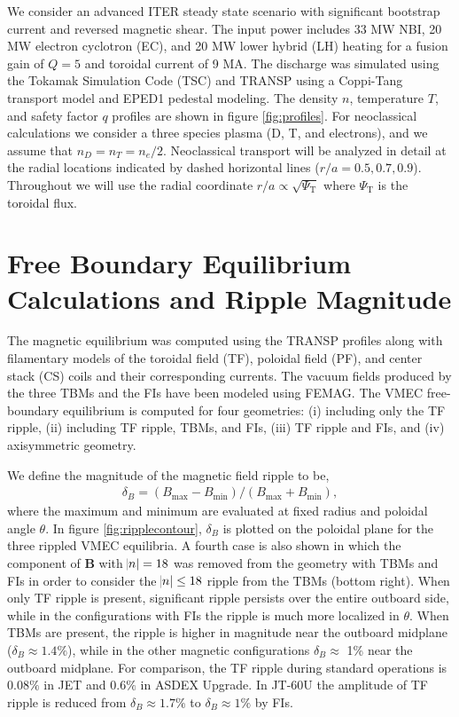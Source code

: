\documentclass[aip, pop, preprint]{revtex4-1}
\numberwithin{figure}{section}
\numberwithin{equation}{section}
\begin{document}
We consider an advanced ITER steady state scenario with significant bootstrap current and reversed magnetic shear.\cite{Poli2014} The input power includes 33 MW NBI, 20 MW electron cyclotron (EC), and 20 MW lower hybrid (LH) heating for a fusion gain of $Q = 5$ and toroidal current of 9 MA. The discharge was simulated using the Tokamak Simulation Code (TSC) \cite{Jardin1986} and TRANSP \cite{Hawryluk1980} using a Coppi-Tang \cite{Jardin1993} transport model and EPED1 \cite{Snyder2011} pedestal modeling. The density $n$, temperature $T$, and safety factor $q$ profiles are shown in figure \ref{fig:profiles}. For neoclassical calculations we consider a three species plasma (D, T, and electrons), and we assume that $n_D = n_T = n_e/2$. Neoclassical transport will be analyzed in detail at the radial locations indicated by dashed horizontal lines ($r/a = 0.5, 0.7, 0.9$). Throughout we will use the radial coordinate $r/a \propto \sqrt{\Psi_{\text{T}}}$ where $\Psi_{\text{T}}$ is the toroidal flux.

\FloatBarrier

\section{Free Boundary Equilibrium Calculations and Ripple Magnitude} \label{vmec}

The magnetic equilibrium was computed using the TRANSP profiles along with filamentary models of the toroidal field (TF), poloidal field (PF), and center stack (CS) coils and their corresponding currents. The vacuum fields produced by the three TBMs and the FIs have been modeled using FEMAG.\cite{Shinohara2009} The VMEC free-boundary equilibrium \cite{Hirshman1986a} is computed for four geometries: (i) including only the TF ripple, (ii) including TF ripple, TBMs, and FIs, (iii) TF ripple and FIs, and (iv) axisymmetric geometry.  

We define the magnitude of the magnetic field ripple to be,
\begin{gather}
\delta_B = (B_{\text{max}}-B_{\text{min}})/(B_{\text{max}} + B_{\text{min}}), 
\end{gather}
where the maximum and minimum are evaluated at fixed radius and poloidal angle $\theta$. In figure \ref{fig:ripplecontour}, $\delta_B$ is plotted on the poloidal plane for the three rippled VMEC equilibria. A fourth case is also shown in which the component of $\bm{B}$ with $\abs{n} = 18$ was removed from the geometry with TBMs and FIs in order to consider the $\abs{n} \leq 18$ ripple from the TBMs (bottom right). When only TF ripple is present, significant ripple persists over the entire outboard side, while in the configurations with FIs the ripple is much more localized in $\theta$. When TBMs are present, the ripple is higher in magnitude near the outboard midplane ($\delta_B \approx 1.4\%$), while in the other magnetic configurations $\delta_B \approx$ 1\% near the outboard midplane. For comparison, the TF ripple during standard operations is $0.08\%$ in JET \cite{DeVries2008b} and $0.6\%$ in ASDEX Upgrade.\cite{Martitsch2016} In JT-60U the amplitude of TF ripple is reduced from $\delta_B \approx 1.7\%$ to $\delta_B \approx 1\%$ by FIs.\cite{Urano2007}
\end{document}
